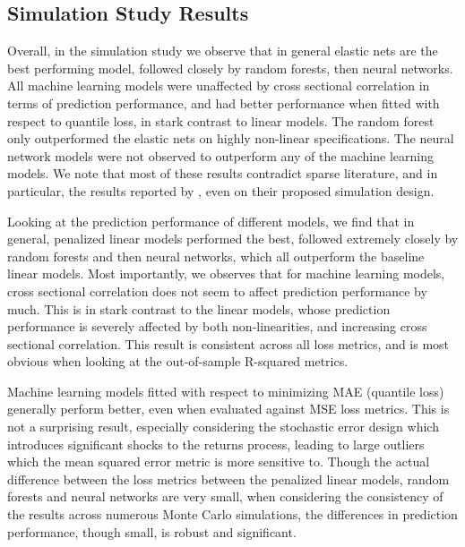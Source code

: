 \documentclass[11pt, a4paper, table]{article}
\begin{document}
\subsection{Simulation Study Results}

Overall, in the simulation study we observe that in general elastic nets are the best performing model, followed closely by random forests, then neural networks. All machine learning models were unaffected by cross sectional correlation in terms of prediction performance, and had better performance when fitted with respect to quantile loss, in stark contrast to linear models. The random forest only outperformed the elastic nets on highly non-linear specifications. The neural network models were not observed to outperform any of the machine learning models. We note that most of these results contradict sparse literature, and in particular, the results reported by \cite{gu_empirical_2018}, even on their proposed simulation design.


Looking at the prediction performance of different models, we find that in general, penalized linear models performed the best, followed extremely closely by random forests and then neural networks, which all outperform the baseline linear models. Most importantly, we observes that for machine learning models, cross sectional correlation does not seem to affect prediction performance by much. This is in stark contrast to the linear models, whose prediction performance is severely affected by both non-linearities, and increasing cross sectional correlation. This result is consistent across all loss metrics, and is most obvious when looking at the out-of-sample R-squared metrics.

Machine learning models fitted with respect to minimizing MAE (quantile loss) generally perform better, even when evaluated against MSE loss metrics. This is not a surprising result, especially considering the stochastic error design which introduces significant shocks to the returns process, leading to large outliers which the mean squared error metric is more sensitive to. Though the actual difference between the loss metrics between the penalized linear models, random forests and neural networks are very small, when considering the consistency of the results across numerous Monte Carlo simulations, the differences in prediction performance, though small, is robust and significant.
\end{document}
